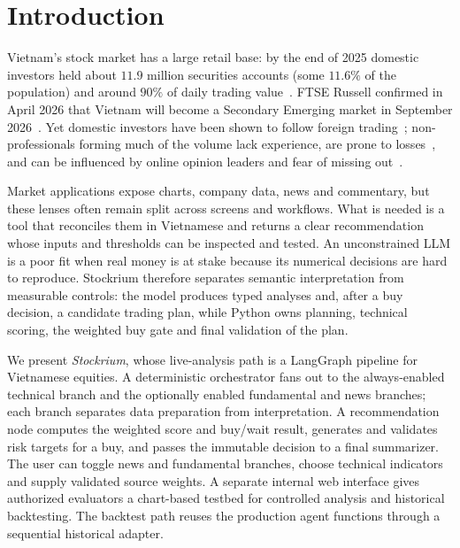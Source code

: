 \documentclass[runningheads]{llncs}
\begin{document}
\section{Introduction}
\label{sec:introduction}

Vietnam's stock market has a large retail base: by the end of 2025 domestic
investors held about $11.9$ million securities accounts (some $11.6\%$ of the
population) and around $90\%$ of daily trading
value~\cite{vsd2025,vinacapital2024}. FTSE Russell confirmed in April 2026 that
Vietnam will become a Secondary Emerging market in September
2026~\cite{ftse2026}. Yet domestic investors have been shown to follow foreign
trading~\cite{vnherd2022}; non-professionals forming much of the volume lack
experience, are prone to losses~\cite{barber2013}, and can be influenced by online
opinion leaders and fear of missing out~\cite{vnfomo}.

Market applications expose charts, company data, news and commentary, but these
lenses often remain split across screens and workflows. What is needed is a tool
that reconciles them in Vietnamese and returns a clear recommendation whose
inputs and thresholds can be inspected and tested. An unconstrained LLM is a poor
fit when real money is at stake because its numerical decisions are hard to
reproduce. Stockrium therefore separates semantic interpretation from measurable
controls: the model produces typed analyses and, after a buy decision, a candidate
trading plan, while Python owns planning, technical scoring, the weighted buy gate
and final validation of the plan.

We present \emph{Stockrium}, whose live-analysis path is a LangGraph pipeline for
Vietnamese equities. A deterministic orchestrator fans out to the
always-enabled technical branch and the optionally enabled fundamental and news
branches; each branch separates data
preparation from interpretation. A recommendation node computes the weighted score
and buy/wait result, generates and validates risk targets for a buy, and passes the
immutable decision to a final summarizer. The user can toggle news and fundamental
branches, choose technical indicators and supply validated source weights. A
separate internal web interface gives authorized evaluators a chart-based testbed
for controlled analysis and historical backtesting. The backtest path reuses the
production agent functions through a sequential historical adapter.
\end{document}
